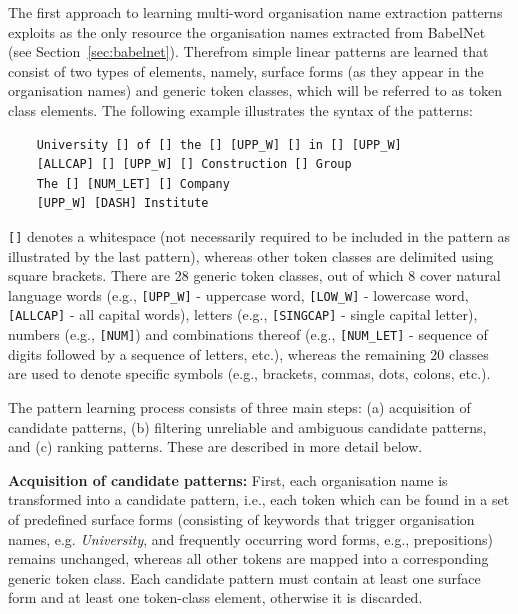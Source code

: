 \documentclass[output=paper]{langsci/langscibook}
\begin{document}
The first approach to learning multi-word organisation name extraction patterns exploits as the only resource the organisation names extracted from BabelNet (see Section~\ref{sec:babelnet}). Therefrom simple linear patterns are learned that consist of two types of elements, namely, surface forms (as they appear in the organisation names) and generic token classes, which will be referred to as token class elements. The following example illustrates the syntax of the patterns:

\begin{verbatim}
    University [] of [] the [] [UPP_W] [] in [] [UPP_W]
    [ALLCAP] [] [UPP_W] [] Construction [] Group
    The [] [NUM_LET] [] Company
    [UPP_W] [DASH] Institute
\end{verbatim}

\noindent \verb+[]+ denotes a whitespace (not necessarily required to be included in the pattern as illustrated by the last pattern), whereas other token classes are delimited using square brackets. There are 28 generic token classes, out of which 8 cover natural language words (e.g., \verb+[UPP_W]+ - uppercase word, \verb+[LOW_W]+ - lowercase word, \verb+[ALLCAP]+ - all capital words), letters (e.g., \verb+[SINGCAP]+ - single capital letter), numbers (e.g., \verb+[NUM]+) and combinations thereof (e.g., \verb+[NUM_LET]+ - sequence of digits followed by a sequence of letters, etc.), whereas the remaining 20 classes are used to denote specific symbols (e.g., brackets, commas, dots, colons, etc.). 

The pattern learning process consists of three main steps: (a) acquisition of candidate patterns, (b) filtering unreliable and ambiguous candidate patterns, and (c) ranking patterns. These are described in more detail below.

\vspace{0.3cm}
\noindent\textbf{Acquisition of candidate patterns:} First, each organisation name is transformed into a candidate pattern, i.e., each token which can be found in a set of predefined surface forms (consisting of keywords that trigger organisation names, e.g.  \textit{University}, and frequently occurring word forms, e.g., prepositions) remains unchanged, whereas all other tokens are mapped into a corresponding generic token class. Each candidate pattern must contain at least one surface form and at least one token-class element,
otherwise it is discarded.
\end{document}

